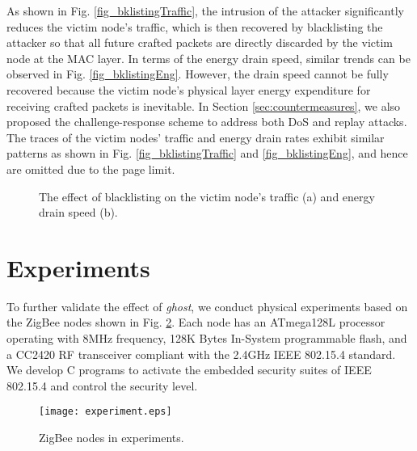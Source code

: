 \documentclass[10pt,journal,cspaper,compsoc]{IEEEtran}
\begin{document}
As shown in Fig. \ref{fig_bklistingTraffic}, the intrusion of the attacker significantly reduces the victim node's traffic, which is then recovered by blacklisting the attacker so that all future crafted packets are directly discarded by the victim node at the MAC layer. In terms of the energy drain speed, similar trends can be observed in Fig. \ref{fig_bklistingEng}. However, the drain speed cannot be fully recovered because the victim node's physical layer energy expenditure for receiving crafted packets is inevitable. In Section \ref{sec:countermeasures}, we also proposed the challenge-response scheme to address both DoS and replay attacks. The traces of the victim nodes' traffic and energy drain rates exhibit similar patterns as shown in Fig. \ref{fig_bklistingTraffic} and \ref{fig_bklistingEng}, and hence are omitted due to the page limit.


\begin{figure}[htbp]
\vspace{-2mm}
	\centering
	\hspace{-5mm}
 \vspace{-1mm}
	\caption{The effect of blacklisting on the victim node's traffic (a) and energy drain speed (b).}	
	\label{Fig_bklisting}
\end{figure}

\section{Experiments}\label{experiment}
To further validate the effect of {\em ghost}, we conduct physical experiments based on the ZigBee nodes shown in Fig. \ref{fig_experiment}. Each node has an ATmega128L processor operating with 8MHz frequency, 128K Bytes In-System programmable flash, and a CC2420 RF transceiver compliant with the 2.4GHz IEEE 802.15.4 standard. We develop C programs to activate the embedded security suites of IEEE 802.15.4 and control the security level.

\begin{figure}[!ht]
    \centering
    \texttt{[image: experiment.eps]}
    \caption{ZigBee nodes in experiments.}
    \label{fig_experiment}
\end{figure}
\end{document}

